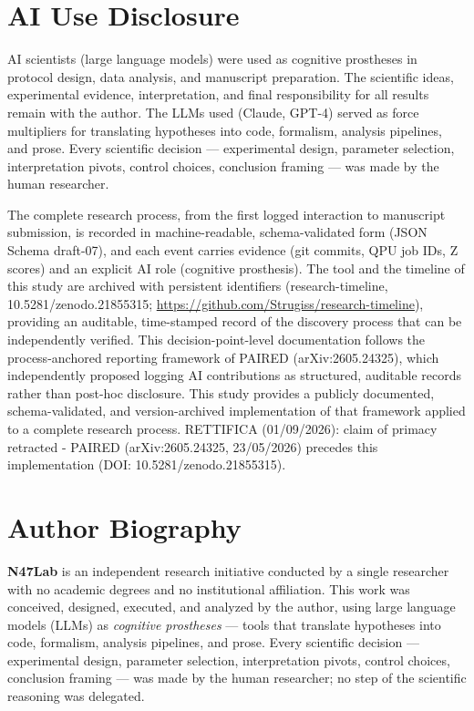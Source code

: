 \documentclass[12pt,a4paper]{article}
\begin{document}
\section*{AI Use Disclosure}

AI scientists (large language models) were used as cognitive prostheses in protocol design, data analysis, and manuscript preparation. The scientific ideas, experimental evidence, interpretation, and final responsibility for all results remain with the author. The LLMs used (Claude, GPT-4) served as force multipliers for translating hypotheses into code, formalism, analysis pipelines, and prose. Every scientific decision --- experimental design, parameter selection, interpretation pivots, control choices, conclusion framing --- was made by the human researcher.

The complete research process, from the first logged interaction to manuscript submission, is recorded in machine-readable, schema-validated form (JSON Schema draft-07), and each event carries evidence (git commits, QPU job IDs, Z scores) and an explicit AI role (cognitive prosthesis). The tool and the timeline of this study are archived with persistent identifiers (research-timeline, 10.5281/zenodo.21855315; \url{https://github.com/Strugiss/research-timeline}), providing an auditable, time-stamped record of the discovery process that can be independently verified. This decision-point-level documentation follows the process-anchored reporting framework of PAIRED (arXiv:2605.24325), which independently proposed logging AI contributions as structured, auditable records rather than post-hoc disclosure. This study provides a publicly documented, schema-validated, and version-archived implementation of that framework applied to a complete research process. RETTIFICA (01/09/2026): claim of primacy retracted - PAIRED (arXiv:2605.24325, 23/05/2026) precedes this implementation (DOI: 10.5281/zenodo.21855315).

\section*{Author Biography}

\textbf{N47Lab} is an independent research initiative conducted by a single researcher with no academic degrees and no institutional affiliation. This work was conceived, designed, executed, and analyzed by the author, using large language models (LLMs) as \textit{cognitive prostheses} --- tools that translate hypotheses into code, formalism, analysis pipelines, and prose. Every scientific decision --- experimental design, parameter selection, interpretation pivots, control choices, conclusion framing --- was made by the human researcher; no step of the scientific reasoning was delegated.
\end{document}

